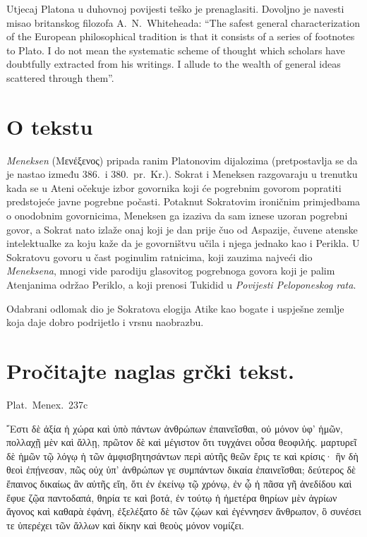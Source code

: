 Utjecaj Platona u duhovnoj povijesti teško je prenaglasiti. Dovoljno je navesti misao britanskog filozofa A.~N.\ Whiteheada: “The safest general characterization of the European philosophical tradition is that it consists of a series of footnotes to Plato. I do not mean the systematic scheme of thought which scholars have doubtfully extracted from his writings. I allude to the wealth of general ideas scattered through them”.

\section*{O tekstu}

\textit{Meneksen} \textgreek[variant=ancient]{(Μενέξενος)} pripada ranim Platonovim dijalozima (pretpostavlja se da je nastao između 386.\ i 380.\ pr.~Kr.). Sokrat i Meneksen razgovaraju u trenutku kada se u Ateni očekuje izbor govornika koji će pogrebnim govorom popratiti predstojeće javne pogrebne počasti. Potaknut Sokratovim ironičnim primjedbama o onodobnim govornicima, Meneksen ga izaziva da sam iznese uzoran pogrebni govor, a Sokrat nato izlaže onaj koji je dan prije čuo od Aspazije, čuvene atenske intelektualke za koju kaže da je govorništvu učila i njega jednako kao i Perikla. U Sokratovu govoru u čast poginulim ratnicima, koji zauzima najveći dio \textit{Meneksena}, mnogi vide parodiju glasovitog pogrebnoga govora koji je palim Atenjanima održao Periklo, a koji prenosi Tukidid u \textit{Povijesti Peloponeskog rata}. 

Odabrani odlomak dio je Sokratova elogija Atike kao bogate i uspješne zemlje koja daje dobro podrijetlo i vrsnu naobrazbu.


\section*{Pročitajte naglas grčki tekst.}

Plat.\ Menex.\ 237c

\medskip

{\large
\begin{greek}
῎Εστι δὲ ἀξία ἡ χώρα καὶ ὑπὸ πάντων ἀνθρώπων ἐπαινεῖσθαι, οὐ μόνον ὑφ' ἡμῶν, πολλαχῇ μὲν καὶ ἄλλῃ, πρῶτον δὲ καὶ μέγιστον ὅτι τυγχάνει οὖσα θεοφιλής. μαρτυρεῖ δὲ ἡμῶν τῷ λόγῳ ἡ τῶν ἀμφισβητησάντων περὶ αὐτῆς θεῶν ἔρις τε καὶ κρίσις· ἣν δὴ θεοὶ ἐπῄνεσαν, πῶς οὐχ ὑπ' ἀνθρώπων γε συμπάντων δικαία ἐπαινεῖσθαι; δεύτερος δὲ ἔπαινος δικαίως ἂν αὐτῆς εἴη, ὅτι ἐν ἐκείνῳ τῷ χρόνῳ, ἐν ᾧ ἡ πᾶσα γῆ ἀνεδίδου καὶ ἔφυε ζῷα παντοδαπά, θηρία τε καὶ βοτά, ἐν τούτῳ ἡ ἡμετέρα θηρίων μὲν ἀγρίων ἄγονος καὶ καθαρὰ ἐφάνη, ἐξελέξατο δὲ τῶν ζῴων καὶ ἐγέννησεν ἄνθρωπον, ὃ συνέσει τε ὑπερέχει τῶν ἄλλων καὶ δίκην καὶ θεοὺς μόνον νομίζει.
\end{greek}

}

